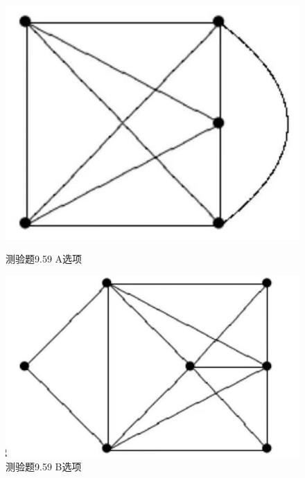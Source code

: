 \documentclass[UTF8, heading=true]{ctexart}
\begin{document}
\begin{figure}[H]
  \centering
  \begin{minipage}[t]{0.3\textwidth}
      \centering
      \includegraphics[width=1\textwidth]{9.59_1.jpg} %
      \vspace{-0.3cm}
      \caption{测验题9.59 A选项}
  \end{minipage}
  \hspace{0.1\textwidth} %
  \begin{minipage}[t]{0.35\textwidth}
      \centering
      \includegraphics[width=1\textwidth]{9.59_2.jpg} %
      \vspace{-0.3cm}
      \caption{测验题9.59 B选项}
\end{minipage}
\end{figure}
\end{document}

